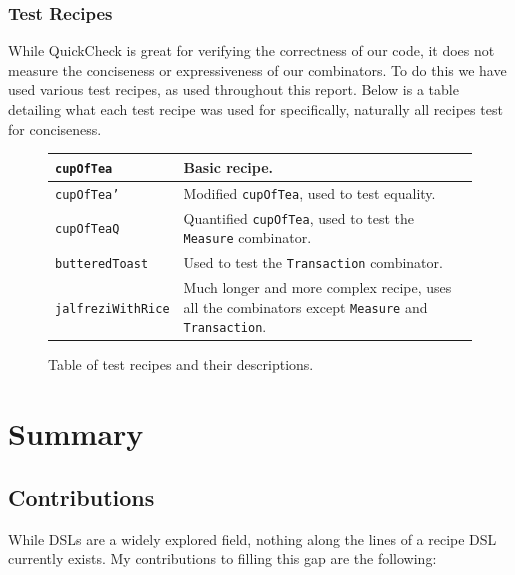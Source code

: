 \documentclass[11pt]{article}
\begin{document}
\medbreak


\subsubsection{Test Recipes}

While QuickCheck is great for verifying the correctness of our code, it does
not measure the conciseness or expressiveness of our combinators. To do this
we have used various test recipes, as used throughout this report. Below
is a table detailing what each test recipe was used for specifically,
naturally all recipes test for conciseness.

\begin{figure}[h]
\begin{tabular}{ |p{35mm}|p{\textwidth - 40mm}| }
    \hline
    \texttt{cupOfTea} & Basic recipe. \\
    \hline
    \texttt{cupOfTea'} & Modified \texttt{cupOfTea}, used to test equality. \\
    \hline
    \texttt{cupOfTeaQ} & Quantified \texttt{cupOfTea}, used to test the \texttt{Measure} combinator. \\
    \hline
    \texttt{butteredToast} & Used to test the \texttt{Transaction} combinator. \\
    \hline
    \texttt{jalfreziWithRice} & Much longer and more complex recipe, uses
        all the combinators except \texttt{Measure} and \texttt{Transaction}. \\
    \hline
\end{tabular}
\caption{Table of test recipes and their descriptions.}
\end{figure}

\section{Summary}

\subsection{Contributions}

While DSLs are a widely explored field, nothing along the lines of a recipe DSL
currently exists. My contributions to filling this gap are the following:
\end{document}

